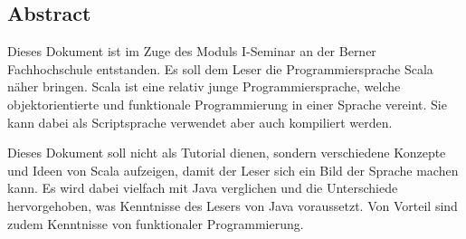 \subsection*{Abstract}

Dieses Dokument ist im Zuge des Moduls I-Seminar an der Berner
Fachhochschule entstanden. Es soll dem Leser die Programmiersprache
Scala näher bringen. Scala ist eine relativ junge Programmiersprache,
welche objektorientierte und funktionale Programmierung in einer Sprache
vereint. Sie kann dabei als Scriptsprache verwendet aber auch kompiliert
werden.

Dieses Dokument soll nicht als Tutorial dienen, sondern
verschiedene Konzepte und Ideen von Scala aufzeigen, damit der Leser
sich ein Bild der Sprache machen kann. Es wird dabei vielfach
mit Java verglichen und die Unterschiede hervorgehoben, was Kenntnisse 
des Lesers von Java voraussetzt. Von Vorteil sind zudem Kenntnisse von
funktionaler Programmierung.

